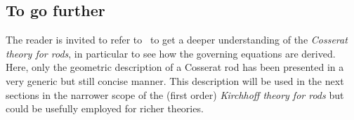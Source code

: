 \subsection{To go further}

The reader is invited to refer to~\cite{Antman2005} to get a deeper understanding of the \emph{Cosserat theory for rods}, in particular to see how the governing equations are derived. Here, only the geometric description of a Cosserat rod has been presented in a very generic but still concise manner. This description will be used in the next sections in the narrower scope of the (first order) \emph{Kirchhoff theory for rods} but could be usefully employed for richer theories.



